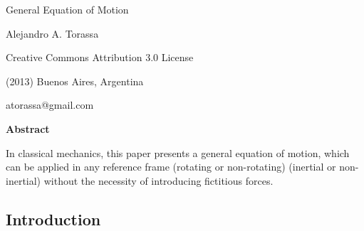 \documentclass[10pt]{article}
\begin{document}
\begin{center}

{\huge General Equation of Motion}

\bigskip \bigskip

{\large Alejandro A. Torassa}

\bigskip \bigskip

\small

Creative Commons Attribution 3.0 License

(2013) Buenos Aires, Argentina

atorassa@gmail.com

\bigskip \medskip

{\bf Abstract}

\bigskip

\parbox{105mm}{In classical mechanics, this paper presents a general equation of motion, which can be applied in any reference frame (rotating or non-rotating) (inertial or non-inertial) without the necessity of introducing fictitious forces.}

\end{center}

\normalsize

\vspace{-0.30em}

{\centering\subsection*{Introduction}}

\vspace{+1.20em}
\end{document}
